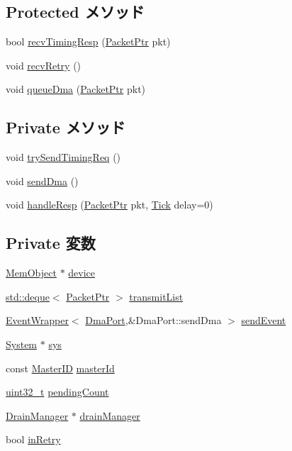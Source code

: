 \subsection*{Protected メソッド}
\begin{DoxyCompactItemize}
\item 
bool \hyperlink{classDmaPort_a482dba5588f4bee43e498875a61e5e0b}{recvTimingResp} (\hyperlink{classPacket}{PacketPtr} pkt)
\item 
void \hyperlink{classDmaPort_a29cb5a4f98063ce6e9210eacbdb35298}{recvRetry} ()
\item 
void \hyperlink{classDmaPort_a39ecf6d3539b9a83c7df974058a5846d}{queueDma} (\hyperlink{classPacket}{PacketPtr} pkt)
\end{DoxyCompactItemize}
\subsection*{Private メソッド}
\begin{DoxyCompactItemize}
\item 
void \hyperlink{classDmaPort_ab4a48e8fe7bec0588669bb654736c5e8}{trySendTimingReq} ()
\item 
void \hyperlink{classDmaPort_accc908efe0611b7a131c978f0d1e2e15}{sendDma} ()
\item 
void \hyperlink{classDmaPort_aa7a9b0bb526bd92c0f952a55f875d443}{handleResp} (\hyperlink{classPacket}{PacketPtr} pkt, \hyperlink{base_2types_8hh_a5c8ed81b7d238c9083e1037ba6d61643}{Tick} delay=0)
\end{DoxyCompactItemize}
\subsection*{Private 変数}
\begin{DoxyCompactItemize}
\item 
\hyperlink{classMemObject}{MemObject} $\ast$ \hyperlink{classDmaPort_a4be8e04a8b8092d55e6b8707f95c1921}{device}
\item 
\hyperlink{classstd_1_1deque}{std::deque}$<$ \hyperlink{classPacket}{PacketPtr} $>$ \hyperlink{classDmaPort_aa1daf4e9dc0076207688f30abccdaab5}{transmitList}
\item 
\hyperlink{classEventWrapper}{EventWrapper}$<$ \hyperlink{classDmaPort}{DmaPort},\&DmaPort::sendDma $>$ \hyperlink{classDmaPort_a944ed919343d4c184161d71c8b113c98}{sendEvent}
\item 
\hyperlink{classSystem}{System} $\ast$ \hyperlink{classDmaPort_a8ae37465ba84acfef6af3e9b9e6dbbd5}{sys}
\item 
const \hyperlink{request_8hh_ac366b729262fd8e7cbd3283da6f775cf}{MasterID} \hyperlink{classDmaPort_a4fe950c0a01bfb6dd81ee92b18162d26}{masterId}
\item 
\hyperlink{Type_8hh_a435d1572bf3f880d55459d9805097f62}{uint32\_\-t} \hyperlink{classDmaPort_a42162a6fc29d8d8b33c43a0d19b60058}{pendingCount}
\item 
\hyperlink{classDrainManager}{DrainManager} $\ast$ \hyperlink{classDmaPort_a329b71fb934a93312ca0aacbf5a3f982}{drainManager}
\item 
bool \hyperlink{classDmaPort_a86588337eae6e277173a8da0cb966462}{inRetry}
\end{DoxyCompactItemize}


